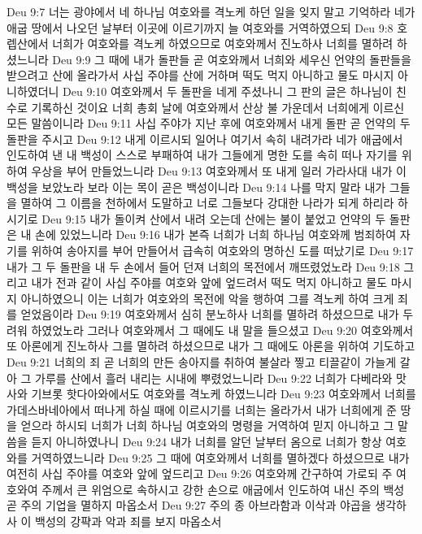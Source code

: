 Deu 9:7  너는 광야에서 네 하나님 여호와를 격노케 하던 일을 잊지 말고 기억하라 네가 애굽 땅에서 나오던 날부터 이곳에 이르기까지 늘 여호와를 거역하였으되
Deu 9:8  호렙산에서 너희가 여호와를 격노케 하였으므로 여호와께서 진노하사 너희를 멸하려 하셨느니라
Deu 9:9  그 때에 내가 돌판들 곧 여호와께서 너희와 세우신 언약의 돌판들을 받으려고 산에 올라가서 사십 주야를 산에 거하며 떡도 먹지 아니하고 물도 마시지 아니하였더니
Deu 9:10  여호와께서 두 돌판을 네게 주셨나니 그 판의 글은 하나님이 친수로 기록하신 것이요 너희 총회 날에 여호와께서 산상 불 가운데서 너희에게 이르신 모든 말씀이니라
Deu 9:11  사십 주야가 지난 후에 여호와께서 내게 돌판 곧 언약의 두 돌판을 주시고
Deu 9:12  내게 이르시되 일어나 여기서 속히 내려가라 네가 애굽에서 인도하여 낸 내 백성이 스스로 부패하여 내가 그들에게 명한 도를 속히 떠나 자기를 위하여 우상을 부어 만들었느니라
Deu 9:13  여호와께서 또 내게 일러 가라사대 내가 이 백성을 보았노라 보라 이는 목이 곧은 백성이니라
Deu 9:14  나를 막지 말라 내가 그들을 멸하여 그 이름을 천하에서 도말하고 너로 그들보다 강대한 나라가 되게 하리라 하시기로
Deu 9:15  내가 돌이켜 산에서 내려 오는데 산에는 불이 붙었고 언약의 두 돌판은 내 손에 있었느니라
Deu 9:16  내가 본즉 너희가 너희 하나님 여호와께 범죄하여 자기를 위하여 송아지를 부어 만들어서 급속히 여호와의 명하신 도를 떠났기로
Deu 9:17  내가 그 두 돌판을 내 두 손에서 들어 던져 너희의 목전에서 깨뜨렸었노라
Deu 9:18  그리고 내가 전과 같이 사십 주야를 여호와 앞에 엎드려서 떡도 먹지 아니하고 물도 마시지 아니하였으니 이는 너희가 여호와의 목전에 악을 행하여 그를 격노케 하여 크게 죄를 얻었음이라
Deu 9:19  여호와께서 심히 분노하사 너희를 멸하려 하셨으므로 내가 두려워 하였었노라 그러나 여호와께서 그 때에도 내 말을 들으셨고
Deu 9:20  여호와께서 또 아론에게 진노하사 그를 멸하려 하셨으므로 내가 그 때에도 아론을 위하여 기도하고
Deu 9:21  너희의 죄 곧 너희의 만든 송아지를 취하여 불살라 찧고 티끌같이 가늘게 갈아 그 가루를 산에서 흘러 내리는 시내에 뿌렸었느니라
Deu 9:22  너희가 다베라와 맛사와 기브롯 핫다아와에서도 여호와를 격노케 하였느니라
Deu 9:23  여호와께서 너희를 가데스바네아에서 떠나게 하실 때에 이르시기를 너희는 올라가서 내가 너희에게 준 땅을 얻으라 하시되 너희가 너희 하나님 여호와의 명령을 거역하여 믿지 아니하고 그 말씀을 듣지 아니하였나니
Deu 9:24  내가 너희를 알던 날부터 옴으로 너희가 항상 여호와를 거역하였느니라
Deu 9:25  그 때에 여호와께서 너희를 멸하겠다 하셨으므로 내가 여전히 사십 주야를 여호와 앞에 엎드리고
Deu 9:26  여호와께 간구하여 가로되 주 여호와여 주께서 큰 위엄으로 속하시고 강한 손으로 애굽에서 인도하여 내신 주의 백성 곧 주의 기업을 멸하지 마옵소서
Deu 9:27  주의 종 아브라함과 이삭과 야곱을 생각하사 이 백성의 강퍅과 악과 죄를 보지 마옵소서
